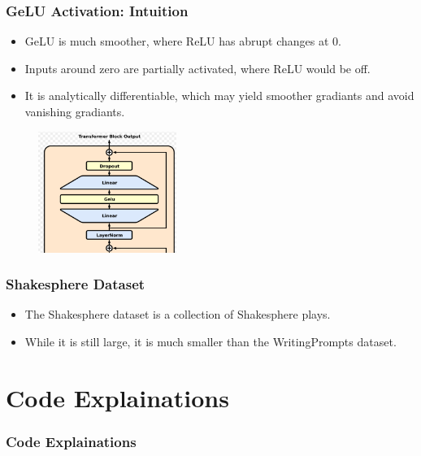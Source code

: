 \documentclass[
    10pt %
    16:9, %
]{beamer}
\begin{document}
\frame 
{
  \frametitle{GeLU Activation: Intuition}
  \begin{itemize}
    \item GeLU is much smoother, where ReLU has abrupt changes at 0.
    \item Inputs around zero are partially activated, where ReLU would be off.
    \item It is analytically differentiable, which may yield smoother gradiants and avoid vanishing gradiants.
  \end{itemize}
  \begin{figure}[h]
    \centering
    \includegraphics[width=0.4\textwidth]{GeLU.png}
  \end{figure}
}

\frame
{
  \frametitle{Shakesphere Dataset}
  \begin{itemize}
    \item The Shakesphere dataset is a collection of Shakesphere plays.
    \item While it is still large, it is much smaller than the WritingPrompts dataset.
  \end{itemize}
}

\section{Code Explainations}

\frame
{
  \frametitle{Code Explainations}
}
\end{document}
